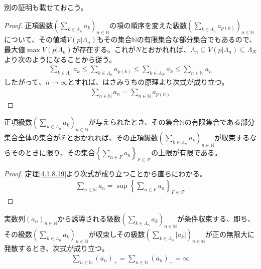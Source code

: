 \documentclass[dvipdfmx]{jsarticle}
\begin{document}
別の証明も載せておこう。
\begin{proof}
正項級数$\left( \sum_{k \in \varLambda_{n}} a_{k} \right)_{n \in \mathbb{N}}$の項の順序を変えた級数$\left( \sum_{k \in \varLambda_{n}} a_{p(k)} \right)_{n \in \mathbb{N}}$について、その値域$V\left( p|\varLambda_{n} \right)$もその集合$\mathbb{N}$の有限集合な部分集合でもあるので、最大値$\max{V\left( p|\varLambda_{n} \right)}$が存在する。これが$N$とおかれれば、$\varLambda_{n} \subseteq V\left( p|\varLambda_{n} \right) \subseteq \varLambda_{N}$より次のようになることから従う。
\begin{align*}
\sum_{k \in \varLambda_{n}} a_{k} \leq \sum_{k \in \varLambda_{n}} a_{p(k)} \leq \sum_{k \in \varLambda_{N}} a_{k} \leq \sum_{n \in \mathbb{N}} a_{n}
\end{align*}
したがって、$n \rightarrow \infty$とすれば、はさみうちの原理より次式が成り立つ。
\begin{align*}
\sum_{n \in \mathbb{N}} a_{n} = \sum_{n \in \mathbb{N}} a_{p(n)}
\end{align*}
\end{proof}
\begin{thm}\label{4.1.8.21}
正項級数$\left( \sum_{k \in \varLambda_{n}} a_{k} \right)_{n \in \mathbb{N}}$が与えられたとき、その集合$\mathbb{N}$の有限集合である部分集合全体の集合が$\mathcal{F}$とおかれれば、その正項級数$\left( \sum_{k \in \varLambda_{n}} a_{k} \right)_{n \in \mathbb{N}}$が収束するならそのときに限り、その集合$\left\{ \sum_{n \in F} a_{n} \right\}_{F\in \mathcal{F}}$の上限が有限である。
\end{thm}
\begin{proof} 定理\ref{4.1.8.19}より次式が成り立つことから直ちにわかる。
\begin{align*}
\sum_{n \in \mathbb{N}} a_{n} = \sup\left\{ \sum_{n \in F} a_{n} \right\}_{F\in \mathcal{F}}
\end{align*}
\end{proof}
\begin{thm}\label{4.1.8.22}
実数列$\left( a_{n} \right)_{n \in \mathbb{N}}$から誘導される級数$\left( \sum_{k \in \varLambda_{n}} a_{k} \right)_{n \in \mathbb{N}}$が条件収束する、即ち、その級数$\left( \sum_{k \in \varLambda_{n}} a_{k} \right)_{n \in \mathbb{N}}$が収束しその級数$\left( \sum_{k \in \varLambda_{n}} \left| a_{k} \right| \right)_{n \in \mathbb{N}}$が正の無限大に発散するとき、次式が成り立つ。
\begin{align*}
\sum_{n \in \mathbb{N}} \left( a_{n} \right)_{+} = \sum_{n \in \mathbb{N}} \left( a_{n} \right)_{-} = \infty
\end{align*}
\end{thm}
\end{document}
